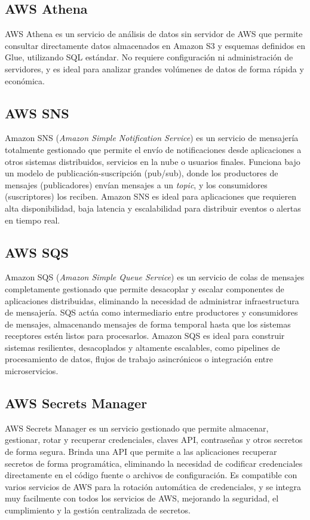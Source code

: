\subsection{AWS Athena}

AWS Athena \citep{aws_athena} es un servicio de análisis de datos sin servidor de AWS que permite consultar directamente datos almacenados en Amazon S3 y esquemas definidos en Glue, utilizando SQL estándar. No requiere configuración ni administración de servidores, y es ideal para analizar grandes volúmenes de datos de forma rápida y económica.

\subsection{AWS SNS}
Amazon SNS (\textit{Amazon Simple Notification Service}) \citep{aws_sns} es un servicio de mensajería totalmente gestionado que permite el envío de notificaciones desde aplicaciones a otros sistemas distribuidos, servicios en la nube o usuarios finales. Funciona bajo un modelo de publicación-suscripción (pub/sub), donde los productores de mensajes (publicadores) envían mensajes a un \textit{topic}, y los consumidores (suscriptores) los reciben. Amazon SNS es ideal para aplicaciones que requieren alta disponibilidad, baja latencia y escalabilidad para distribuir eventos o alertas en tiempo real.


\subsection{AWS SQS}
Amazon SQS (\textit{Amazon Simple Queue Service}) \citep{aws_sqs} es un servicio de colas de mensajes completamente gestionado que permite desacoplar y escalar componentes de aplicaciones distribuidas, eliminando la necesidad de administrar infraestructura de mensajería. SQS actúa como intermediario entre productores y consumidores de mensajes, almacenando mensajes de forma temporal hasta que los sistemas receptores estén listos para procesarlos. Amazon SQS es ideal para construir sistemas resilientes, desacoplados y altamente escalables, como pipelines de procesamiento de datos, flujos de trabajo asincrónicos o integración entre microservicios.


\subsection{AWS Secrets Manager}
AWS Secrets Manager \citep{aws_secrets} es un servicio gestionado que permite almacenar, gestionar, rotar y recuperar credenciales, claves API, contraseñas y otros secretos de forma segura. Brinda una API que permite a las aplicaciones recuperar secretos de forma programática, eliminando la necesidad de codificar credenciales directamente en el código fuente o archivos de configuración. Es compatible con varios servicios de AWS para la rotación automática de credenciales, y se integra muy facilmente con todos los servicios de AWS, mejorando la seguridad, el cumplimiento y la gestión centralizada de secretos.


